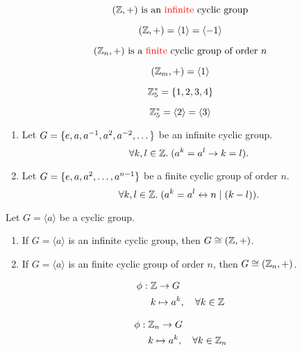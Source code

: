 \begin{frame}
  \[
    (\mathbb{Z}, +) \text{ is an \textcolor{red}{infinite} cyclic group}
  \]

  \pause
  \[
    (\mathbb{Z}, +) = \langle 1 \rangle = \langle -1 \rangle
  \]

  \pause
  \vspace{0.50cm}
  \[
    (\mathbb{Z}_{n}, +) \text{ is a \textcolor{red}{finite} cyclic group of order } n
  \]

  \pause
  \[
    (\mathbb{Z}_{m}, +) = \langle 1 \rangle
  \]
\end{frame}

\begin{frame}
  \[
    \mathbb{Z}^{\ast}_{5} = \{1, 2, 3, 4\}
  \]

  \pause
  \[
    \mathbb{Z}^{\ast}_{5} = \langle 2 \rangle = \langle 3 \rangle
  \]
\end{frame}

\begin{frame}{}
  \begin{theorem}
    \begin{enumerate}[<+->][(1)]
      \setlength{\itemsep}{6pt}
      \item Let $G = \{e, a, a^{-1}, a^2, a^{-2}, \dots\}$
        be an infinite cyclic group.
        \[
          \forall k, l \in \mathbb{Z}.\; (a^k = a^l \to k = l).
        \]
      \item Let $G = \{e, a, a^2, \dots, a^{n-1}\}$
        be a finite cyclic group of order $n$.
        \[
          \forall k, l \in \mathbb{Z}.\; (a^{k} = a^{l} \leftrightarrow n \mid (k-l)).
        \]
    \end{enumerate}
  \end{theorem}
\end{frame}

\begin{frame}
  \begin{theorem}
    Let $G = \langle a \rangle$ be a cyclic group.
    \begin{enumerate}[(1)]
      \setlength{\itemsep}{6pt}
      \item If $G = \langle a \rangle$ is an infinite cyclic group,
        then $G \cong (\mathbb{Z}, +)$.
      \item If $G = \langle a \rangle$ is an finite cyclic group of order $n$,
        then $G \cong (\mathbb{Z}_{n}, +)$.
    \end{enumerate}
  \end{theorem}

  \pause
  \begin{align*}
    \phi:\; &\mathbb{Z} \to G \\
    &k \mapsto a^{k}, \quad \forall k \in \mathbb{Z}
  \end{align*}

  \pause
  \begin{align*}
    \phi:\; &\mathbb{Z}_{n} \to G \\
    &k \mapsto a^{k}, \quad \forall k \in \mathbb{Z}_{n}
  \end{align*}
\end{frame}

